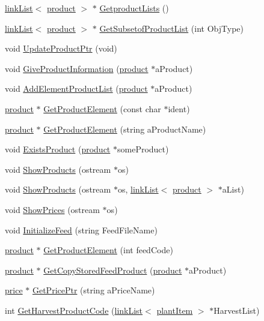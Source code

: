 \begin{DoxyCompactItemize}
\item 
\hyperlink{classlink_list}{linkList}$<$ \hyperlink{classproduct}{product} $>$ $\ast$ \hyperlink{classproducts_aab079f48661f64c4771d87f3d867baa8}{GetproductLists} ()
\item 
\hyperlink{classlink_list}{linkList}$<$ \hyperlink{classproduct}{product} $>$ $\ast$ \hyperlink{classproducts_a0396e9f7c6e68510fb507a7af74bc5bc}{GetSubsetofProductList} (int ObjType)
\item 
void \hyperlink{classproducts_a1f3ef16fd1cb7ca9dc7f3e9e4c257b27}{UpdateProductPtr} (void)
\item 
void \hyperlink{classproducts_a8bd239aabc0a167741c02882e305d65d}{GiveProductInformation} (\hyperlink{classproduct}{product} $\ast$aProduct)
\item 
void \hyperlink{classproducts_ae429268b58f42c812d1eacc2954500b2}{AddElementProductList} (\hyperlink{classproduct}{product} $\ast$aProduct)
\item 
\hyperlink{classproduct}{product} $\ast$ \hyperlink{classproducts_a9381e599dba699b633f183cb66c7ba12}{GetProductElement} (const char $\ast$ident)
\item 
\hyperlink{classproduct}{product} $\ast$ \hyperlink{classproducts_aab404bf964b8ae9272a30710a953e9c0}{GetProductElement} (string aProductName)
\item 
void \hyperlink{classproducts_ae50bd05450d23bd7d6f48f602c1b515d}{ExistsProduct} (\hyperlink{classproduct}{product} $\ast$someProduct)
\item 
void \hyperlink{classproducts_a4f87e6c90ed2a421f101b7a04668c5cc}{ShowProducts} (ostream $\ast$os)
\item 
void \hyperlink{classproducts_a74c59dd845faf4570e5a4010722cfc95}{ShowProducts} (ostream $\ast$os, \hyperlink{classlink_list}{linkList}$<$ \hyperlink{classproduct}{product} $>$ $\ast$aList)
\item 
void \hyperlink{classproducts_aada833a6042e21579d64f15edb742b01}{ShowPrices} (ostream $\ast$os)
\item 
void \hyperlink{classproducts_a04c5d318238082bbdd59023d1e499af9}{InitializeFeed} (string FeedFileName)
\item 
\hyperlink{classproduct}{product} $\ast$ \hyperlink{classproducts_a0236cbb567600326e95e323e39066190}{GetProductElement} (int feedCode)
\item 
\hyperlink{classproduct}{product} $\ast$ \hyperlink{classproducts_ac13e4e332916d2e8b6d0f6bf04cadc4d}{GetCopyStoredFeedProduct} (\hyperlink{classproduct}{product} $\ast$aProduct)
\item 
\hyperlink{classprice}{price} $\ast$ \hyperlink{classproducts_aa31314fc97c7604a5e092022053e5543}{GetPricePtr} (string aPriceName)
\item 
int \hyperlink{classproducts_a17077e1bcda62eee96530b9b4e8b0a10}{GetHarvestProductCode} (\hyperlink{classlink_list}{linkList}$<$ \hyperlink{classplant_item}{plantItem} $>$ $\ast$HarvestList)
\end{DoxyCompactItemize}
